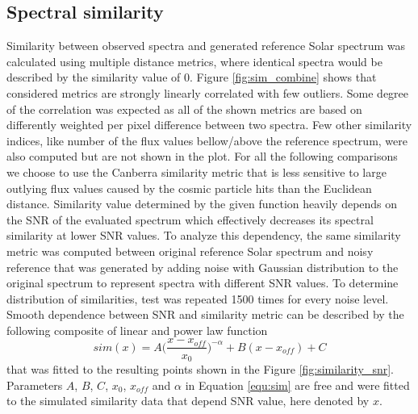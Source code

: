 \subsection{Spectral similarity}
Similarity between observed spectra and generated reference Solar spectrum was calculated using multiple distance metrics, where identical spectra would be described by the similarity value of 0. Figure \ref{fig:sim_combine} shows that considered metrics are strongly linearly correlated with few outliers. Some degree of the correlation was expected as all of the shown metrics are based on differently weighted per pixel difference between two spectra. Few other similarity indices, like number of the flux values bellow/above the reference spectrum, were also computed but are not shown in the plot. For all the following comparisons we choose to use the Canberra similarity metric that is less sensitive to large outlying flux values caused by the cosmic particle hits than the Euclidean distance. Similarity value determined by the given function heavily depends on the SNR of the evaluated spectrum which effectively decreases its spectral similarity at lower SNR values. To analyze this dependency, the same similarity metric was computed between original reference Solar spectrum and noisy reference that was generated by adding noise with Gaussian distribution to the original spectrum to represent spectra with different SNR values. To determine distribution of similarities, test was repeated 1500 times for every noise level. Smooth dependence between SNR and similarity metric can be described by the following composite of linear and power law function
\begin{equation}
\label{equ:sim}
sim(x) = A \Big(\frac{x-x_{off}}{x_0}\Big)^{-\alpha} + B (x-x_{off}) + C
\end{equation}
that was fitted to the resulting points shown in the Figure \ref{fig:similarity_snr}. Parameters $A$, $B$, $C$, $x_0$, $x_{off}$ and $\alpha$ in Equation \ref{equ:sim} are free and were fitted to the simulated similarity data that depend SNR value, here denoted by $x$.

